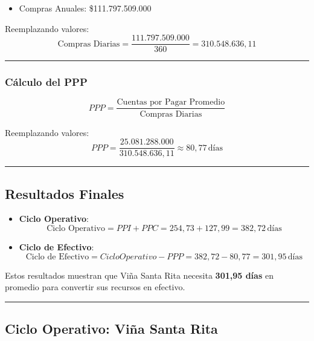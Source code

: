 \documentclass[
  letterpaper,
  DIV=11,
  numbers=noendperiod]{scrartcl}
\providecommand{\tightlist}{%
  \setlength{\itemsep}{0pt}\setlength{\parskip}{0pt}}\usepackage{longtable,booktabs,array}
\begin{document}
\begin{itemize}
\tightlist
\item
  Compras Anuales: \$111.797.509.000
\end{itemize}

Reemplazando valores: \[
\text{Compras Diarias} = \frac{111.797.509.000}{360} = 310.548.636,11
\]

\begin{center}\rule{0.5\linewidth}{0.5pt}\end{center}

\subsubsection{\texorpdfstring{Cálculo del
\textbf{PPP}}{Cálculo del PPP}}\label{cuxe1lculo-del-ppp}

\[
PPP = \frac{\text{Cuentas por Pagar Promedio}}{\text{Compras Diarias}}
\]

Reemplazando valores: \[
PPP = \frac{25.081.288.000}{310.548.636,11} \approx 80,77 \, \text{días}
\]

\begin{center}\rule{0.5\linewidth}{0.5pt}\end{center}

\subsection{Resultados Finales}\label{resultados-finales}

\begin{itemize}
\item
  \textbf{Ciclo Operativo}: \[
  \text{Ciclo Operativo} = PPI + PPC = 254,73 + 127,99 = 382,72 \, \text{días}
  \]
\item
  \textbf{Ciclo de Efectivo}: \[
  \text{Ciclo de Efectivo} = Ciclo Operativo - PPP = 382,72 - 80,77 = 301,95 \, \text{días}
  \]
\end{itemize}

Estos resultados muestran que Viña Santa Rita necesita \textbf{301,95
días} en promedio para convertir sus recursos en efectivo.

\begin{center}\rule{0.5\linewidth}{0.5pt}\end{center}

\subsection{Ciclo Operativo: Viña Santa
Rita}\label{ciclo-operativo-viuxf1a-santa-rita}
\end{document}
